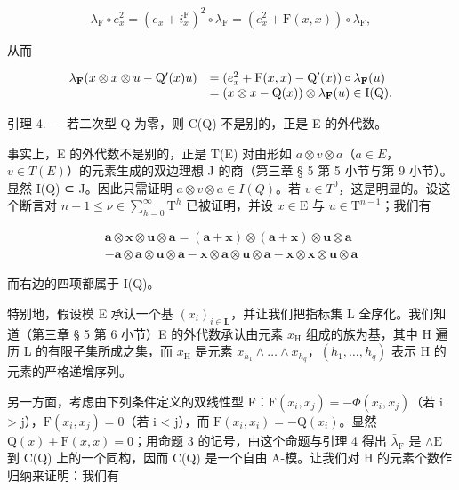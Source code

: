 \[
\lambda_ {\mathrm{F}} \circ e _ {x} ^ {2} = (e _ {x} + i _ {x} ^ {\mathrm{F}}) ^ {2} \circ \lambda_ {\mathrm{F}} = (e _ {x} ^ {2} + \mathrm{F} (x, x)) \circ \lambda_ {\mathrm{F}},
\]

从而

\[
\begin{array}{r l} \lambda_ {\mathbf {F}} (x \otimes x \otimes u - \mathrm{Q} ^ {\prime} (x) u) & = (e _ {x} ^ {2} + \mathrm{F} (x, x) - \mathrm{Q} ^ {\prime} (x)) \circ \lambda_ {\mathbf {F}} (u) \\ & = (x \otimes x - \mathrm{Q} (x)) \otimes \lambda_ {\mathbf {F}} (u) \in \mathrm{I} (\mathrm{Q}). \end{array}
\]

引理 4. — 若二次型 Q 为零，则 C(Q) 不是别的，正是 E 的外代数。

  事实上，E 的外代数不是别的，正是 T(E) 对由形如 \(a \otimes v \otimes a\)（\(a \in E\)，\(v \in T(E)\)）的元素生成的双边理想 J 的商（第三章 § 5 第 5 小节与第 9 小节）。显然 I(Q) ⊂ J。因此只需证明 \(a \otimes v \otimes a \in I(Q)\)。若 \(v \in T^0\)，这是明显的。设这个断言对 \(n-1 \leqslant \nu \in \sum_{h=0}^{\infty} \mathrm{T}^{h}\) 已被证明，并设 \(x \in \mathrm{E}\) 与 \(u \in \mathrm{T}^{n-1}\)；我们有

\[
\begin{array}{c} \boldsymbol {a} \otimes \boldsymbol {x} \otimes \boldsymbol {u} \otimes \boldsymbol {a} = (\boldsymbol {a} + \boldsymbol {x}) \otimes (\boldsymbol {a} + \boldsymbol {x}) \otimes \boldsymbol {u} \otimes \boldsymbol {a} \\ - \boldsymbol {a} \otimes \boldsymbol {a} \otimes \boldsymbol {u} \otimes \boldsymbol {a} - \boldsymbol {x} \otimes \boldsymbol {a} \otimes \boldsymbol {u} \otimes \boldsymbol {a} - \boldsymbol {x} \otimes \boldsymbol {x} \otimes \boldsymbol {u} \otimes \boldsymbol {a} \end{array}
\]

  而右边的四项都属于 I(Q)。

  特别地，假设模 E 承认一个基 \((x_{i})_{i\in \mathbf{L}}\)，并让我们把指标集 L 全序化。我们知道（第三章 § 5 第 6 小节）E 的外代数承认由元素 \(x_{\mathrm{H}}\) 组成的族为基，其中 H 遍历 L 的有限子集所成之集，而 \(x_{\mathrm{H}}\) 是元素 \(x_{h_1}\wedge \ldots \wedge x_{h_q}\)，\((h_1,\ldots ,h_q)\) 表示 H 的元素的严格递增序列。

  另一方面，考虑由下列条件定义的双线性型 F：\(\mathrm{F}(x_{i}, x_{j}) = -\Phi(x_{i}, x_{j})\)（若 i \textgreater{} j），\(\mathrm{F}(x_{i}, x_{j}) = 0\)（若 i \textless{} j），而 \(\mathrm{F}(x_{i}, x_{i}) = -\mathrm{Q}(x_{i})\)。显然 \(\mathrm{Q}(x) + \mathrm{F}(x, x) = 0\)；用命题 3 的记号，由这个命题与引理 4 得出 \(\bar{\lambda}_{\mathrm{F}}\) 是 \(\wedge \mathrm{E}\) 到 C(Q) 上的一个同构，因而 C(Q) 是一个自由 A-模。让我们对 H 的元素个数作归纳来证明：我们有


